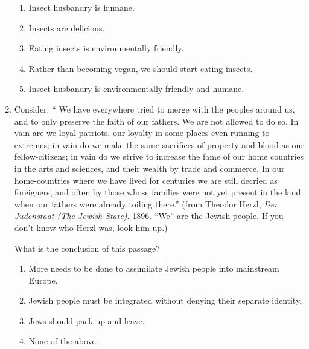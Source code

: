 \begin{enumerate}
 \begin{enumerate}

  \item Insect husbandry is humane.

  \item Insects are delicious.

  \item Eating insects is environmentally friendly.

  \item Rather than becoming vegan, we should start eating insects.

  \item Insect husbandry is environmentally friendly and humane.

 \end{enumerate}


\item Consider: `` We have everywhere tried to merge with the peoples around us,
and to only preserve the faith of our fathers. We are not allowed to do so. In 
vain are we loyal patriots, our loyalty in some places even running to extremes; 
in vain do we make the same sacrifices of property and blood as our
fellow-citizens; in vain do we strive to increase the fame of our
home countries in the arts and sciences, and their wealth by trade and commerce.
In our home-countries  where we have lived for centuries we are still decried as 
foreigners, and often by those whose families were not yet
present in the land when our fathers were already toiling there.'' (from Theodor 
Herzl, \emph{Der Judenstaat (The Jewish State)}. 1896. ``We'' are the Jewish 
people. If you don't know who Herzl was, look him up.)

What is the conclusion of this passage?

\begin{enumerate}

 \item More needs to be done to assimilate Jewish people into mainstream Europe.

 \item Jewish people must be integrated without denying their separate identity.

 \item Jews should pack up and leave.

 \item None of the above.

\end{enumerate}

\end{enumerate}


